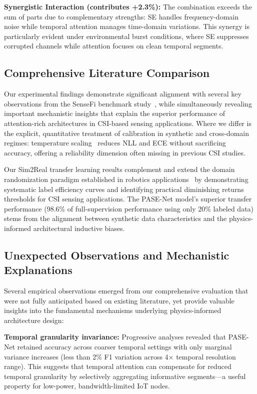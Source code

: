 \documentclass[lettersize,journal]{IEEEtran}
\begin{document}
\textbf{Synergistic Interaction (contributes +2.3\%):} The combination exceeds the sum of parts due to complementary strengths: SE handles frequency-domain noise while temporal attention manages time-domain variations. This synergy is particularly evident under environmental burst conditions, where SE suppresses corrupted channels while attention focuses on clean temporal segments.

\subsection{Comprehensive Literature Comparison}

Our experimental findings demonstrate significant alignment with several key observations from the SenseFi benchmark study~\cite{yang2023sensefi}, while simultaneously revealing important mechanistic insights that explain the superior performance of attention-rich architectures in CSI-based sensing applications. Where we differ is the explicit, quantitative treatment of calibration in synthetic and cross-domain regimes: temperature scaling~\cite{calibration_guo2017} reduces NLL and ECE without sacrificing accuracy, offering a reliability dimension often missing in previous CSI studies.

Our Sim2Real transfer learning results complement and extend the domain randomization paradigm established in robotics applications~\cite{peng2018sim2real} by demonstrating systematic label efficiency curves and identifying practical diminishing returns thresholds for CSI sensing applications. The PASE-Net model's superior transfer performance (98.6\% of full-supervision performance using only 20\% labeled data) stems from the alignment between synthetic data characteristics and the physics-informed architectural inductive biases.

\subsection{Unexpected Observations and Mechanistic Explanations}

Several empirical observations emerged from our comprehensive evaluation that were not fully anticipated based on existing literature, yet provide valuable insights into the fundamental mechanisms underlying physics-informed architecture design:

\textbf{Temporal granularity invariance:} Progressive analyses revealed that PASE-Net retained accuracy across coarser temporal settings with only marginal variance increases (less than 2\% F1 variation across 4× temporal resolution range). This suggests that temporal attention can compensate for reduced temporal granularity by selectively aggregating informative segments—a useful property for low-power, bandwidth-limited IoT nodes.
\end{document}

